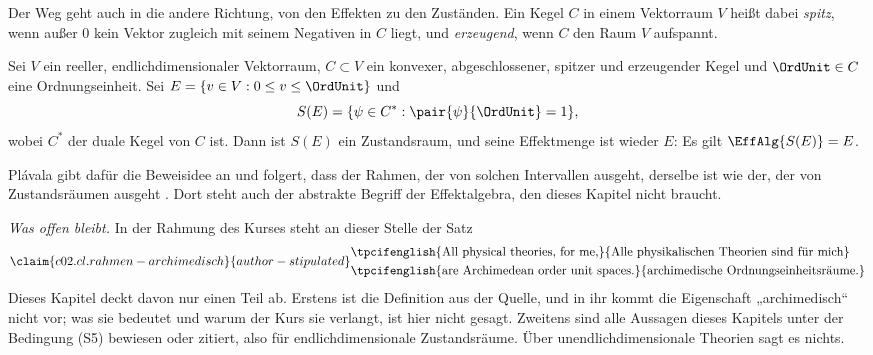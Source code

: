 \begin{fundament}
  Der Weg geht auch in die andere Richtung, von den Effekten zu den Zuständen. Ein Kegel
  $C$ in einem Vektorraum $V$ heißt dabei \emph{spitz}, wenn außer $0$ kein Vektor zugleich
  mit seinem Negativen in $C$ liegt, und \emph{erzeugend}, wenn $C$ den Raum $V$
  aufspannt.

  \begin{proposition}\label{c02.prop.rueckweg}
    Sei $V$ ein reeller, endlichdimensionaler Vektorraum, $C \subset V$ ein konvexer,
    abgeschlossener, spitzer und erzeugender Kegel und $\OrdUnit \in C$ eine
    Ordnungseinheit. Sei $E = \{ v \in V : 0 \leq v \leq \OrdUnit \}$ und
    \begin{equation}\label{c02.eq.rueckweg}
      S(E) = \{ \psi \in C^{*} : \pair{\psi}{\OrdUnit} = 1 \} ,
    \end{equation}
    wobei $C^{*}$ der duale Kegel von $C$ ist. Dann ist $S(E)$ ein Zustandsraum, und seine
    Effektmenge ist wieder $E$: Es gilt $\EffAlg{S(E)} = E$.
  \end{proposition}

  Plávala gibt dafür die Beweisidee an und folgert, dass der Rahmen, der von solchen
  Intervallen ausgeht, derselbe ist wie der, der von Zustandsräumen ausgeht
  .
  Dort steht auch der abstrakte Begriff der Effektalgebra, den dieses Kapitel nicht
  braucht.

  \emph{Was offen bleibt.} In der Rahmung des Kurses steht an dieser Stelle der Satz
  \begin{equation}\label{c02.eq.rahmen-archimedisch}\claim{c02.cl.rahmen-archimedisch}{author-stipulated}
    \begin{aligned}
      &\text{\tpcifenglish{All physical theories, for me,}{Alle physikalischen Theorien sind für mich}} \\
      &\text{\tpcifenglish{are Archimedean order unit spaces.}{archimedische Ordnungseinheitsräume.}}
    \end{aligned}
  \end{equation}
  Dieses Kapitel deckt davon nur einen Teil ab. Erstens ist  die Definition aus
  der Quelle, und in ihr kommt die Eigenschaft „archimedisch“ nicht vor; was sie bedeutet
  und warum der Kurs sie verlangt, ist hier nicht gesagt. Zweitens sind alle Aussagen
  dieses Kapitels unter der Bedingung (S5) bewiesen oder zitiert, also für
  endlichdimensionale Zustandsräume. Über unendlichdimensionale Theorien sagt es nichts.
\end{fundament}
